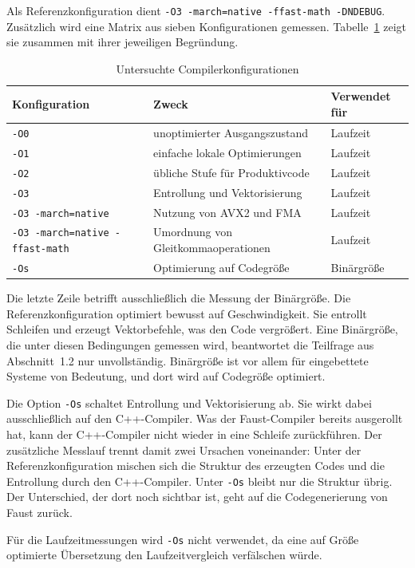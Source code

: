 Als Referenzkonfiguration dient \texttt{-O3 -march=native -ffast-math
-DNDEBUG}. Zusätzlich wird eine Matrix aus sieben Konfigurationen gemessen.
Tabelle~\ref{tab:flags} zeigt sie zusammen mit ihrer jeweiligen Begründung.

\begin{table}[htb]
\centering
\caption{Untersuchte Compilerkonfigurationen}
\label{tab:flags}
\begin{tabular}{lll}
\hline
Konfiguration & Zweck & Verwendet für \\
\hline
\texttt{-O0} & unoptimierter Ausgangszustand & Laufzeit \\
\texttt{-O1} & einfache lokale Optimierungen & Laufzeit \\
\texttt{-O2} & übliche Stufe für Produktivcode & Laufzeit \\
\texttt{-O3} & Entrollung und Vektorisierung & Laufzeit \\
\texttt{-O3 -march=native} & Nutzung von AVX2 und FMA & Laufzeit \\
\texttt{-O3 -march=native -ffast-math} & Umordnung von Gleitkommaoperationen & Laufzeit \\
\texttt{-Os} & Optimierung auf Codegröße & Binärgröße \\
\hline
\end{tabular}
\end{table}

Die letzte Zeile betrifft ausschließlich die Messung der Binärgröße. Die
Referenzkonfiguration optimiert bewusst auf Geschwindigkeit. Sie entrollt
Schleifen und erzeugt Vektorbefehle, was den Code vergrößert. Eine
Binärgröße, die unter diesen Bedingungen gemessen wird, beantwortet die
Teilfrage aus Abschnitt~1.2 nur unvollständig. Binärgröße ist vor allem für
eingebettete Systeme von Bedeutung, und dort wird auf Codegröße optimiert.

Die Option \texttt{-Os} schaltet Entrollung und Vektorisierung ab. Sie wirkt
dabei ausschließlich auf den C++-Compiler. Was der Faust-Compiler bereits
ausgerollt hat, kann der C++-Compiler nicht wieder in eine Schleife
zurückführen. Der zusätzliche Messlauf trennt damit zwei Ursachen
voneinander: Unter der Referenzkonfiguration mischen sich die Struktur des
erzeugten Codes und die Entrollung durch den C++-Compiler. Unter \texttt{-Os}
bleibt nur die Struktur übrig. Der Unterschied, der dort noch sichtbar ist,
geht auf die Codegenerierung von Faust zurück.

Für die Laufzeitmessungen wird \texttt{-Os} nicht verwendet, da eine auf
Größe optimierte Übersetzung den Laufzeitvergleich verfälschen würde.

